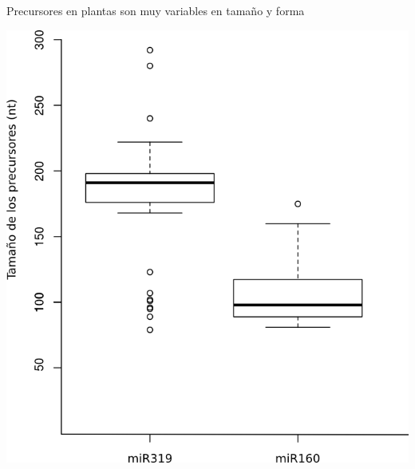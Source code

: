 \documentclass{beamer}
\begin{document}
\begin{frame}{Precursores en plantas son muy variables en tamaño y forma}
	\begin{center}
		\includegraphics[width=.5\textwidth]{img/hairpin_distribution.png}
	\end{center}
\end{frame}
\end{document}
